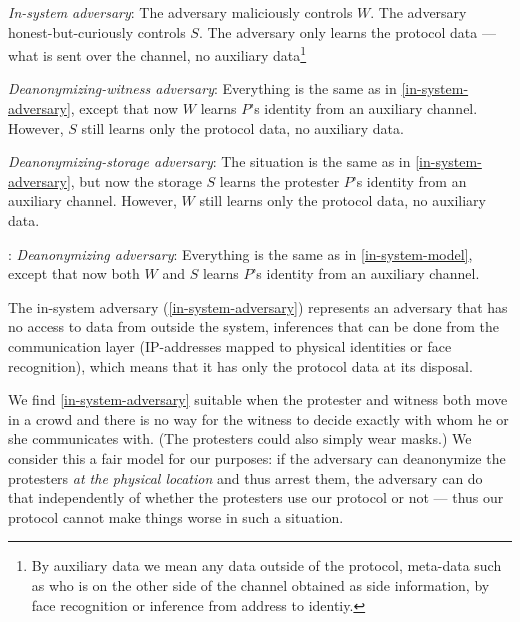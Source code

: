\begin{adversaries}
\item\label{in-system-adversary}
  \emph{In-system adversary}:
  The adversary maliciously controls \(W\).
  The adversary honest-but-curiously controls \(S\).
  The adversary only learns the protocol data --- \ie what is sent over the 
  channel, no auxiliary data\footnote{%
    By auxiliary data we mean any data outside of the protocol, \ie
    meta-data such as who is on the other side of the channel obtained
    as side information, \eg by face recognition or inference from address
    to identiy.
  }

\item\label{deanonymizing-witness-adversary}
  \emph{Deanonymizing-witness adversary}:
  Everything is the same as in \cref{in-system-adversary}, except that now 
  \(W\) learns \(P\)'s identity from an auxiliary channel.
  However, \(S\) still learns only the protocol data, no auxiliary data.

\item\label{deanonymizing-storage-adversary}
  \emph{Deanonymizing-storage adversary}:
  The situation is the same as in \cref{in-system-adversary}, but now the storage 
  \(S\) learns the protester \(P\)'s identity from an auxiliary channel.
  However, \(W\) still learns only the protocol data, no auxiliary data.

\item\label{deanonymizing-adversary}:
  \emph{Deanonymizing adversary}:
  Everything is the same as in \cref{in-system-model}, except that now both 
  \(W\) and \(S\) learns \(P\)'s identity from an auxiliary channel.
\end{adversaries}

The in-system adversary (\cref{in-system-adversary}) represents an adversary 
that has no access to data from outside the system, \eg inferences that can be 
done from the communication layer (\eg IP-addresses mapped to physical 
identities or face recognition), which means that it has only the protocol data 
at its disposal.

We find \cref{in-system-adversary} suitable when the protester and witness both 
move in a crowd and there is no way for the witness to decide exactly with whom 
he or she communicates with.
(The protesters could also simply wear masks.)
We consider this a fair model for our purposes: if the adversary can 
deanonymize the protesters \emph{at the physical location} and thus arrest 
them, the adversary can do that independently of whether the protesters use our 
protocol or not --- thus our protocol cannot make things worse in such a 
situation.

